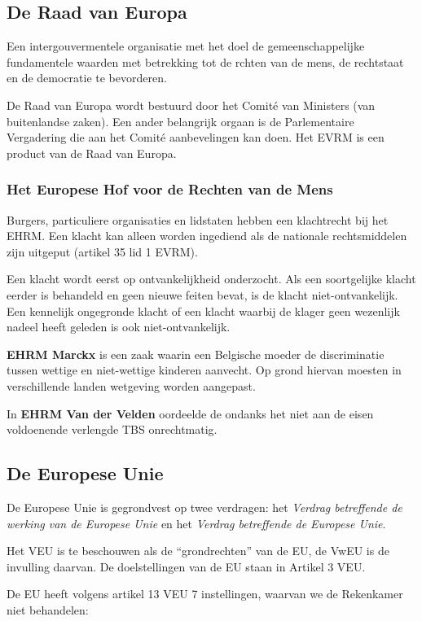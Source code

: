 \documentclass{article}
\begin{document}
\subsection{De Raad van Europa}

Een intergouvermentele organisatie met het doel de gemeenschappelijke
fundamentele waarden met betrekking tot de rchten van de mens, de rechtstaat en
de democratie te bevorderen.

De Raad van Europa wordt bestuurd door het Comit\'e van Ministers (van
buitenlandse zaken). Een ander belangrijk orgaan is de Parlementaire
Vergadering die aan het Comit\'e aanbevelingen kan doen. Het EVRM is een
product van de Raad van Europa.

\subsubsection{Het Europese Hof voor de Rechten van de Mens}

Burgers, particuliere organisaties en lidstaten hebben een klachtrecht bij het
EHRM. Een klacht kan alleen worden ingediend als de nationale rechtsmiddelen
zijn uitgeput (artikel 35 lid 1 EVRM).

Een klacht wordt eerst op ontvankelijkheid onderzocht. Als een soortgelijke
klacht eerder is behandeld en geen nieuwe feiten bevat, is de klacht
niet-ontvankelijk. Een kennelijk ongegronde klacht of een klacht waarbij de
klager geen wezenlijk nadeel heeft geleden is ook niet-ontvankelijk.

\textbf{EHRM Marckx} is een zaak waarin een Belgische moeder de discriminatie
tussen wettige en niet-wettige kinderen aanvecht. Op grond hiervan moesten in
verschillende landen wetgeving worden aangepast.

In \textbf{EHRM Van der Velden} oordeelde de ondanks het niet aan de eisen
voldoenende verlengde TBS onrechtmatig.

\subsection{De Europese Unie}

De Europese Unie is gegrondvest op twee verdragen: het \emph{Verdrag
betreffende de werking van de Europese Unie} en het \emph{Verdrag betreffende
de Europese Unie}.

Het VEU is te beschouwen als de ``grondrechten'' van de EU, de VwEU is de
invulling daarvan. De doelstellingen van de EU staan in Artikel 3 VEU.

De EU heeft volgens artikel 13 VEU 7 instellingen, waarvan we de Rekenkamer
niet behandelen:
\end{document}
